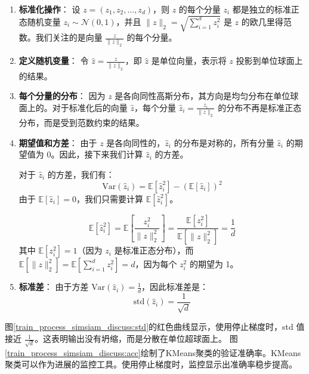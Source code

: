 \documentclass[master]{thesis-uestc}
\begin{document}
\begin{enumerate}
    \item \textbf{标准化操作}：
    设 \( z = (z_1, z_2, \dots, z_d) \)，则 \( z \) 的每个分量 \( z_i \) 都是独立的标准正态随机变量 \( z_i \sim \mathcal{N}(0, 1) \)，并且 \( \|z\|_2 = \sqrt{\sum_{i=1}^{d} z_i^2} \) 是 \( z \) 的欧几里得范数。我们关注的是向量 \( \frac{z}{\|z\|_2} \) 的每个分量。

    \item \textbf{定义随机变量}：
    令 \( \hat{z} = \frac{z}{\|z\|_2} \)，即 \( \hat{z} \) 是单位向量，表示将 \( z \) 投影到单位球面上的结果。

    \item \textbf{每个分量的分布}：
    因为 \( z \) 是各向同性高斯分布，其方向是均匀分布在单位球面上的。对于标准化后的向量 \( \hat{z} \)，每个分量 \( \hat{z}_i = \frac{z_i}{\|z\|_2} \) 的分布不再是标准正态分布，而是受到范数约束的结果。

    \item \textbf{期望值和方差}：
    由于 \( z \) 是各向同性的，\( \hat{z}_i \) 的分布是对称的，所有分量 \( \hat{z}_i \) 的期望值为 0。因此，接下来我们计算 \( \hat{z}_i \) 的方差。

    对于 \( \hat{z}_i \) 的方差，我们有：
    \begin{equation}
    \text{Var}(\hat{z}_i) = \mathbb{E}[\hat{z}_i^2] - (\mathbb{E}[\hat{z}_i])^2
    \end{equation}
    由于 \( \mathbb{E}[\hat{z}_i] = 0 \)，我们只需要计算 \( \mathbb{E}[\hat{z}_i^2] \)。

    \begin{equation}
    \mathbb{E}[\hat{z}_i^2] = \mathbb{E}\left[\frac{z_i^2}{\|z\|_2^2}\right] = \frac{\mathbb{E}[z_i^2]}{\mathbb{E}[\|z\|_2^2]} = \frac{1}{d}
    \end{equation}
    其中 \( \mathbb{E}[z_i^2] = 1 \)（因为 \( z_i \) 是标准正态分布），而 \( \mathbb{E}[\|z\|_2^2] = \mathbb{E}[\sum_{i=1}^{d} z_i^2] = d \)，因为每个 \( z_i^2 \) 的期望为 1。

    \item \textbf{标准差}：
    由于方差 \( \text{Var}(\hat{z}_i) = \frac{1}{d} \)，因此标准差是：
    \begin{equation}
    \text{std}(\hat{z}_i) = \frac{1}{\sqrt{d}}
    \end{equation}
\end{enumerate}


图\ref{train_process_simsiam_discuss:std}的红色曲线显示，使用停止梯度时，std 值接近 \( \frac{1}{\sqrt{d}} \)。这表明输出没有坍缩，而是分散在单位超球面上。
图\ref{train_process_simsiam_discuss:acc}绘制了KMeans聚类的验证准确率。KMeans聚类可以作为进展的监控工具。使用停止梯度时，监控显示出准确率稳步提高。
\end{document}
